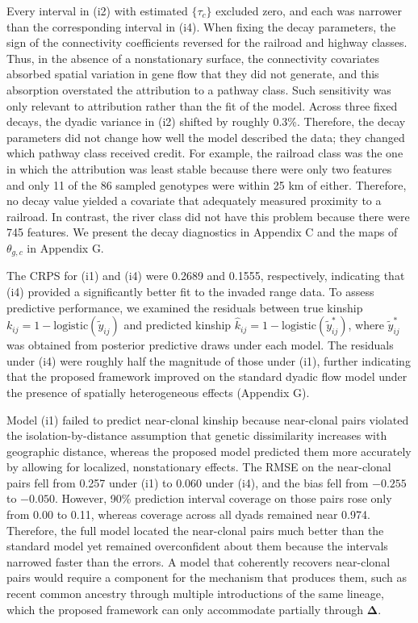\documentclass{article}
\begin{document}
Every interval in (i2) with estimated $\{\tau_c\}$ excluded zero, and each was narrower than the corresponding interval in (i4). When fixing the decay parameters, the sign of the connectivity coefficients reversed for the railroad and highway classes. Thus, in the absence of a nonstationary surface, the connectivity covariates absorbed spatial variation in gene flow that they did not generate, and this absorption overstated the attribution to a pathway class. Such sensitivity was only relevant to attribution rather than the fit of the model. Across three fixed decays, the dyadic variance in (i2) shifted by roughly 0.3\%. Therefore, the decay parameters did not change how well the model described the data; they changed which pathway class received credit. For example, the railroad class was the one in which the attribution was least stable because there were only two features and only 11 of the 86 sampled genotypes were within 25 km of either. Therefore, no decay value yielded a covariate that adequately measured proximity to a railroad. In contrast, the river class did not have this problem because there were 745 features.
We present the decay diagnostics in Appendix C and the maps of $\theta_{g,c}$ in Appendix G.


The CRPS for (i1) and (i4) were 0.2689 and 0.1555, respectively, indicating that (i4) provided a significantly better fit to the invaded range data.
To assess predictive performance, we examined the residuals between true kinship $k_{ij}=1-\text{logistic}(\widetilde{y}_{ij})$ and predicted kinship $\hat{k}_{ij}=1-\text{logistic}(\widetilde{y}^*_{ij})$, where $\widetilde{y}^*_{ij}$ was obtained from posterior predictive draws under each model. The residuals under (i4) were roughly half the magnitude of those under (i1), further indicating that the proposed framework improved on the standard dyadic flow model under the presence of spatially heterogeneous effects (Appendix G). 

Model (i1) failed to predict near-clonal kinship because near-clonal pairs violated the isolation-by-distance assumption that genetic dissimilarity increases with geographic distance, whereas the proposed model predicted them more accurately by allowing for localized, nonstationary effects. 
The RMSE on the near-clonal pairs fell from 0.257 under (i1) to 0.060 under (i4), and the bias fell from $-0.255$ to $-0.050$. However, 90\% prediction interval coverage on those pairs rose only from 0.00 to 0.11, whereas coverage across all dyads remained near 0.974. Therefore, the full model located the near-clonal pairs much better than the standard model yet remained overconfident about them because the intervals narrowed faster than the errors. A model that coherently recovers near-clonal pairs would require a component for the mechanism that produces them, such as recent common ancestry through multiple introductions of the same lineage, which the proposed framework can only accommodate partially through $\boldsymbol{\Delta}$.
\end{document}
